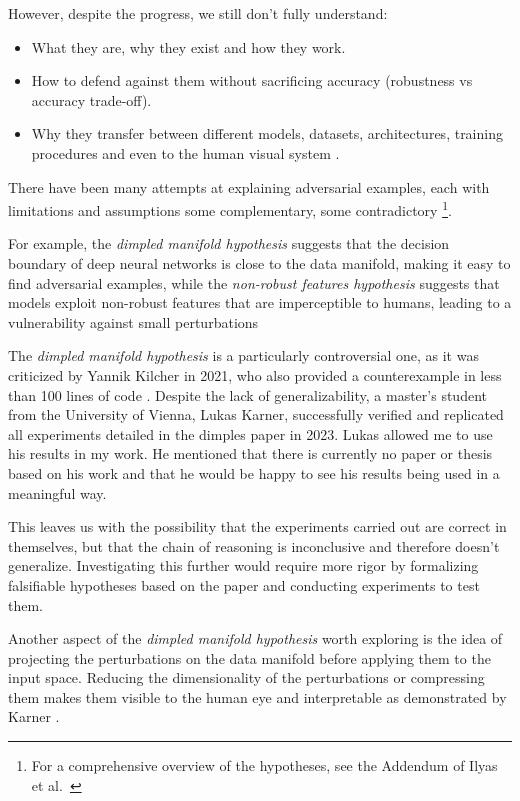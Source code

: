 \documentclass[a4paper, oneside]{discothesis}
\begin{document}
However, despite the progress, we still don't fully understand:

\begin{itemize}
    \item What they are, why they exist and how they work.
    \item How to defend against them without sacrificing accuracy (robustness vs accuracy trade-off).
    \item Why they transfer between different models, datasets, architectures, training procedures and even to the human visual system \cite{elsayed2018adversarial}.
\end{itemize}

There have been many attempts at explaining adversarial examples, each with limitations and assumptions \textendash{} some complementary, some contradictory  \footnote{For a comprehensive overview of the hypotheses, see the Addendum of Ilyas et al.~\cite{ilyas2019adversarial}}.

For example, the \textit{dimpled manifold hypothesis} \cite{shamir2021dimpled}  suggests that the decision boundary of deep neural networks is close to the data manifold, making it easy to find adversarial examples, while the \textit{non-robust features hypothesis} \cite{ilyas2019adversarial} suggests that models exploit non-robust features that are imperceptible to humans, leading to a vulnerability against small perturbations

The \textit{dimpled manifold hypothesis} is a particularly controversial one, as it was criticized by Yannik Kilcher \cite{kilcher2021dimpled} in 2021, who also provided a counterexample in less than 100 lines of code \cite{kilcher2021dimpledcode}. Despite the lack of generalizability, a master's student from the University of Vienna, Lukas Karner, successfully verified and replicated all experiments detailed in the dimples paper \cite{karner2023dimpled} in 2023. Lukas allowed me to use his results in my work. He mentioned that there is currently no paper or thesis based on his work and that he would be happy to see his results being used in a meaningful way.

This leaves us with the possibility that the experiments carried out are correct in themselves, but that the chain of reasoning is inconclusive and therefore doesn't generalize. Investigating this further would require more rigor by formalizing falsifiable hypotheses based on the paper and conducting experiments to test them.

Another aspect of the \textit{dimpled manifold hypothesis} worth exploring is the idea of projecting the perturbations on the data manifold before applying them to the input space. Reducing the dimensionality of the perturbations or compressing them makes them visible to the human eye and interpretable as demonstrated by Karner \cite{karner2023dimpled}.
\end{document}
